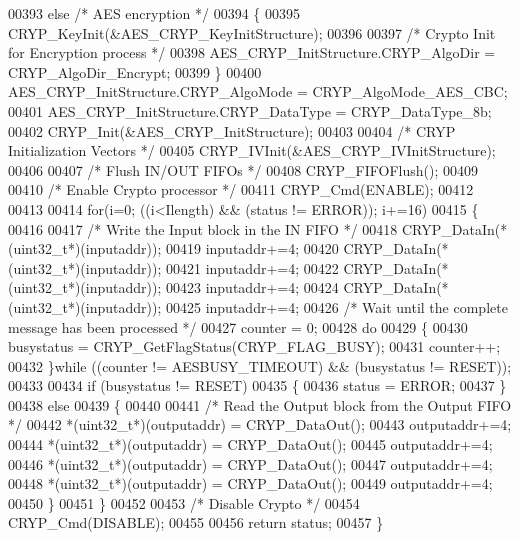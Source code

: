 \begin{DoxyCode}
00393   \textcolor{keywordflow}{else} \textcolor{comment}{/* AES encryption */}
00394   \{
00395     CRYP_KeyInit(&AES\_CRYP\_KeyInitStructure);
00396 
00397     \textcolor{comment}{/* Crypto Init for Encryption process */}
00398     AES\_CRYP\_InitStructure.CRYP_AlgoDir  = CRYP_AlgoDir_Encrypt;
00399   \}
00400   AES\_CRYP\_InitStructure.CRYP_AlgoMode = CRYP_AlgoMode_AES_CBC;
00401   AES\_CRYP\_InitStructure.CRYP_DataType = CRYP_DataType_8b;
00402   CRYP_Init(&AES\_CRYP\_InitStructure);
00403 
00404   \textcolor{comment}{/* CRYP Initialization Vectors */}
00405   CRYP_IVInit(&AES\_CRYP\_IVInitStructure);
00406 
00407   \textcolor{comment}{/* Flush IN/OUT FIFOs */}
00408   CRYP_FIFOFlush();
00409 
00410   \textcolor{comment}{/* Enable Crypto processor */}
00411   CRYP_Cmd(ENABLE);
00412 
00413 
00414   \textcolor{keywordflow}{for}(i=0; ((i<Ilength) && (status != ERROR)); i+=16)
00415   \{
00416 
00417     \textcolor{comment}{/* Write the Input block in the IN FIFO */}
00418     CRYP_DataIn(*(uint32\_t*)(inputaddr));
00419     inputaddr+=4;
00420     CRYP_DataIn(*(uint32\_t*)(inputaddr));
00421     inputaddr+=4;
00422     CRYP_DataIn(*(uint32\_t*)(inputaddr));
00423     inputaddr+=4;
00424     CRYP_DataIn(*(uint32\_t*)(inputaddr));
00425     inputaddr+=4;
00426     \textcolor{comment}{/* Wait until the complete message has been processed */}
00427     counter = 0;
00428     \textcolor{keywordflow}{do}
00429     \{
00430       busystatus = CRYP_GetFlagStatus(CRYP_FLAG_BUSY);
00431       counter++;
00432     \}\textcolor{keywordflow}{while} ((counter != AESBUSY_TIMEOUT) && (busystatus != RESET));
00433 
00434     \textcolor{keywordflow}{if} (busystatus != RESET)
00435    \{
00436        status = ERROR;
00437     \}
00438     \textcolor{keywordflow}{else}
00439     \{
00440 
00441       \textcolor{comment}{/* Read the Output block from the Output FIFO */}
00442       *(uint32\_t*)(outputaddr) = CRYP_DataOut();
00443       outputaddr+=4;
00444       *(uint32\_t*)(outputaddr) = CRYP_DataOut();
00445       outputaddr+=4;
00446       *(uint32\_t*)(outputaddr) = CRYP_DataOut();
00447       outputaddr+=4;
00448       *(uint32\_t*)(outputaddr) = CRYP_DataOut();
00449       outputaddr+=4;
00450     \}
00451   \}
00452 
00453   \textcolor{comment}{/* Disable Crypto */}
00454   CRYP_Cmd(DISABLE);
00455 
00456   \textcolor{keywordflow}{return} status;
00457 \}
\end{DoxyCode}
\mbox{\label{group__CRYP__Group6_ga2f36aea6e94452e5e5e938547fb89d4c}} 
